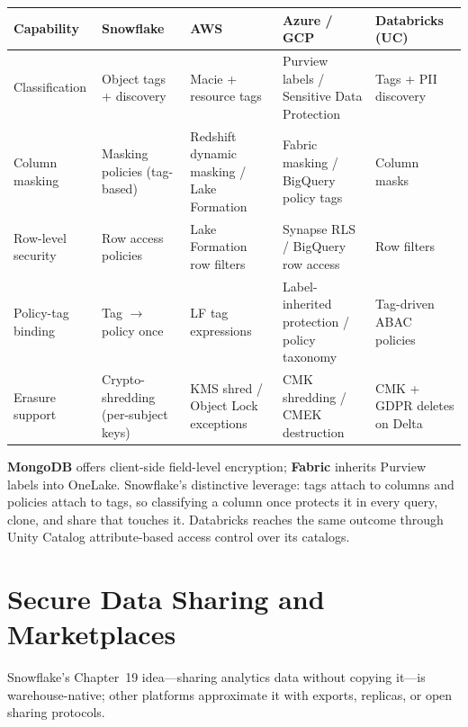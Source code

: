 \begin{center}
\footnotesize
\begin{tabular}{@{}p{2.5cm}p{2.9cm}p{2.7cm}p{2.9cm}p{2.9cm}@{}}
\toprule
\textbf{Capability} & \textbf{Snowflake} & \textbf{AWS} & \textbf{Azure / GCP} & \textbf{Databricks (UC)} \\
\midrule
Classification & Object tags + discovery & Macie + resource tags & Purview labels / Sensitive Data Protection & Tags + PII discovery \\
Column masking & Masking policies (tag-based) & Redshift dynamic masking / Lake Formation & Fabric masking / BigQuery policy tags & Column masks \\
Row-level security & Row access policies & Lake Formation row filters & Synapse RLS / BigQuery row access & Row filters \\
Policy-tag binding & Tag $\rightarrow$ policy once & LF tag expressions & Label-inherited protection / policy taxonomy & Tag-driven ABAC policies \\
Erasure support & Crypto-shredding (per-subject keys) & KMS shred / Object Lock exceptions & CMK shredding / CMEK destruction & CMK + GDPR deletes on Delta \\
\bottomrule
\end{tabular}
\end{center}

\noindent \textbf{MongoDB} offers client-side field-level encryption; \textbf{Fabric} inherits
Purview labels into OneLake. Snowflake's distinctive leverage: tags attach to columns and
policies attach to tags, so classifying a column once protects it in every query, clone, and
share that touches it. Databricks reaches the same outcome through Unity Catalog attribute-based
access control over its catalogs.

\section{Secure Data Sharing and Marketplaces}
%
Snowflake's Chapter~19 idea---sharing analytics data without copying it---is warehouse-native;
other platforms approximate it with exports, replicas, or open sharing protocols.

